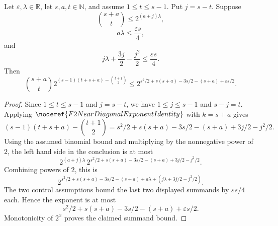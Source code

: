 \begin{helper}
Let \(\varepsilon,\lambda\in\mathbb R\), let \(s,a,t\in\mathbb N\), and
assume \(1\le t\le s-1\). Put \(j=s-t\). Suppose
\[
  \binom{s+a}{t}\le 2^{(a+j)\lambda},
\]
\[
  a\lambda\le \frac{\varepsilon s}{4},
\]
and
\[
  j\lambda+\frac{3j}{2}-\frac{j^2}{2}\le \frac{\varepsilon s}{4}.
\]
Then
\[
  \binom{s+a}{t}
    2^{(s-1)(t+s+a)-\binom{t+1}{2}}
  \le
  2^{s^2/2+s(s+a)-3s/2-(s+a)+\varepsilon s/2}.
\]
\end{helper}
\begin{proof}
Since \(1\le t\le s-1\) and \(j=s-t\), we have \(1\le j\le s-1\) and
\(s-j=t\). Applying \(\noderef{F2NearDiagonalExponentIdentity}\) with
\(k=s+a\) gives
\[
  (s-1)(t+s+a)-\binom{t+1}{2}
  =
  s^2/2+s(s+a)-3s/2-(s+a)+3j/2-j^2/2.
\]
Using the assumed binomial bound and multiplying by the nonnegative power of
\(2\), the left hand side in the conclusion is at most
\[
  2^{(a+j)\lambda}\,
  2^{s^2/2+s(s+a)-3s/2-(s+a)+3j/2-j^2/2}.
\]
Combining powers of \(2\), this is
\[
  2^{
    s^2/2+s(s+a)-3s/2-(s+a)
    +a\lambda+
    \left(j\lambda+3j/2-j^2/2\right)}.
\]
The two control assumptions bound the last two displayed summands by
\(\varepsilon s/4\) each. Hence the exponent is at most
\[
  s^2/2+s(s+a)-3s/2-(s+a)+\varepsilon s/2.
\]
Monotonicity of \(2^x\) proves the claimed summand bound.
\end{proof}
